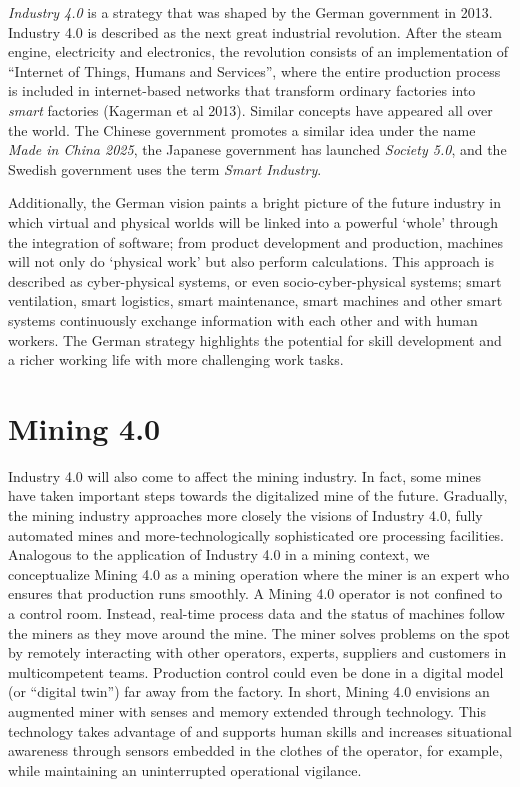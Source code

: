 \documentclass[
  12pt,
]{scrbook}
\begin{document}
\emph{Industry 4.0} is a strategy that was shaped by the German government in 2013. Industry 4.0 is described as the next great industrial revolution. After the steam engine, electricity and electronics, the revolution consists of an implementation of ``Internet of Things, Humans and Services'', where the entire production process is included in internet-based networks that transform ordinary factories into \emph{smart} factories (Kagerman et al 2013). Similar concepts have appeared all over the world. The Chinese government promotes a similar idea under the name \emph{Made in China 2025}, the Japanese government has launched \emph{Society 5.0}, and the Swedish government uses the term \emph{Smart Industry}.

Additionally, the German vision paints a bright picture of the future industry in which virtual and physical worlds will be linked into a powerful `whole' through the integration of software; from product development and production, machines will not only do `physical work' but also perform calculations. This approach is described as cyber-physical systems, or even socio-cyber-physical systems; smart ventilation, smart logistics, smart maintenance, smart machines and other smart systems continuously exchange information with each other and with human workers. The German strategy highlights the potential for skill development and a richer working life with more challenging work tasks.

\hypertarget{mining-4.0}{%
\section*{Mining 4.0}\label{mining-4.0}}

Industry 4.0 will also come to affect the mining industry. In fact, some mines have taken important steps towards the digitalized mine of the future. Gradually, the mining industry approaches more closely the visions of Industry 4.0, fully automated mines and more-technologically sophisticated ore processing facilities. Analogous to the application of Industry 4.0 in a mining context, we conceptualize Mining 4.0 as a mining operation where the miner is an expert who ensures that production runs smoothly. A Mining 4.0 operator is not confined to a control room. Instead, real-time process data and the status of machines follow the miners as they move around the mine. The miner solves problems on the spot by remotely interacting with other operators, experts, suppliers and customers in multicompetent teams. Production control could even be done in a digital model (or ``digital twin'') far away from the factory. In short, Mining 4.0 envisions an augmented miner with senses and memory extended through technology. This technology takes advantage of and supports human skills and increases situational awareness through sensors embedded in the clothes of the operator, for example, while maintaining an uninterrupted operational vigilance.
\end{document}
